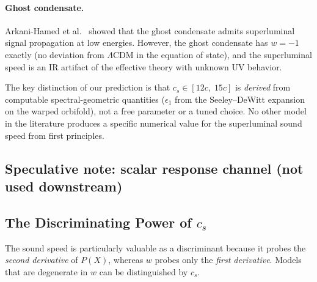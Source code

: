 \paragraph{Ghost condensate.}
Arkani-Hamed et al.~\cite{ch5:ArkaniHamed2004} showed that the ghost condensate admits superluminal signal propagation at low energies. However, the ghost condensate has $w = -1$ exactly (no deviation from $\Lambda$CDM in the equation of state), and the superluminal speed is an IR artifact of the effective theory with unknown UV behavior.

\medskip

The key distinction of our prediction is that $c_s \in [12c,\; 15c]$ is \emph{derived} from computable spectral-geometric quantities ($\epsilon_1$ from the Seeley--DeWitt expansion on the warped orbifold), not a free parameter or a tuned choice. No other model in the literature produces a specific numerical value for the superluminal sound speed from first principles.

\subsection*{Speculative note: scalar response channel (not used downstream)}
\label{sec:5-engineering}

\noindent{}

\subsection{The Discriminating Power of \texorpdfstring{$c_s$}{cs}}
\label{sec:5-discriminating}

The sound speed is particularly valuable as a discriminant because it probes the \emph{second derivative} of $P(X)$, whereas $w$ probes only the \emph{first derivative}. Models that are degenerate in $w$ can be distinguished by $c_s$.

